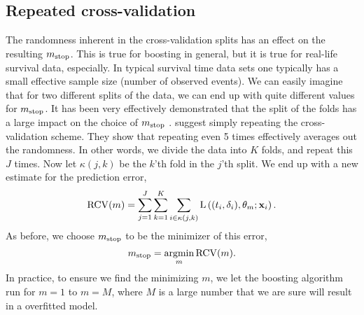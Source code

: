 \subsection{Repeated cross-validation}
The randomness inherent in the cross-validation splits has an effect on the resulting $m_{\text{stop}}$. This is true for boosting in general, but it is true for real-life survival data, especially. In typical survival time data sets one typically has a small effective sample size (number of observed events). We can easily imagine that for two different splits of the data, we can end up with quite different values for $m_{\text{stop}}$.
It has been very effectively demonstrated that the split of the folds has a large impact on the choice of $m_{\text{stop}}$ \citep{seibold}. \citet{seibold} suggest simply repeating the cross-validation scheme. They show that repeating even 5 times effectively averages out the randomness.  In other words, we divide the data into $K$ folds, and repeat this $J$ times. Now let $\kappa(j, k)$ be the $k$'th fold in the $j$'th split. We end up with a new estimate for the prediction error,
\begin{equation}
    \operatorname{RCV}(m)=\sum_{j=1}^J\sum_{k=1}^K\sum_{i\in\kappa(j,k)}\operatorname{L}\left((t_i,\delta_i),\theta_m;\mathbf{x}_i\right).
\end{equation}
As before, we choose $m_{\text{stop}}$ to be the minimizer of this error,
\begin{equation}
    m_{\text{stop}}=\operatorname*{argmin}_{m}\operatorname{RCV}(m).
\end{equation}
In practice, to ensure we find the minimizing $m$, we let the boosting algorithm run for $m=1$ to $m=M$, where $M$ is a large number that we are sure will result in a overfitted model.


